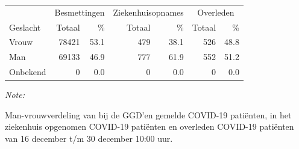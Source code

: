 \documentclass[
  english,
  man,floatsintext]{apa6}
\begin{document}
\begin{table}[H]
\centering\begingroup\fontsize{11}{13}\selectfont

\begin{threeparttable}
\begin{tabular}{lrrrrrr}
\toprule
\multicolumn{1}{c}{ } & \multicolumn{2}{c}{Besmettingen} & \multicolumn{2}{c}{Ziekenhuisopnames} & \multicolumn{2}{c}{Overleden} \\
\cmidrule(l{3pt}r{3pt}){2-3} \cmidrule(l{3pt}r{3pt}){4-5} \cmidrule(l{3pt}r{3pt}){6-7}
Geslacht & Totaal & \% & Totaal & \% & Totaal & \%\\
\midrule
Vrouw & 78421 & 53.1 & 479 & 38.1 & 526 & 48.8\\
Man & 69133 & 46.9 & 777 & 61.9 & 552 & 51.2\\
Onbekend & 0 & 0.0 & 0 & 0.0 & 0 & 0.0\\
\bottomrule
\end{tabular}
\begin{tablenotes}
\item \textit{Note: } 
\item Man-vrouwverdeling van bij de GGD’en gemelde COVID-19 patiënten, in het ziekenhuis opgenomen COVID-19 patiënten en overleden COVID-19 patiënten van 16 december t/m 30 december 10:00 uur.
\end{tablenotes}
\end{threeparttable}
\endgroup{}
\end{table}
\newpage
\end{document}
